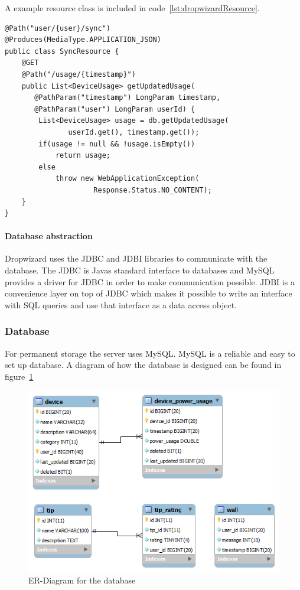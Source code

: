 A example resource class is included in code~\ref{lst:dropwizardResource}.
\newpage

\begin{lstlisting}[caption={Dropwizard resource example}, label={lst:dropwizardResource}]
@Path("user/{user}/sync")
@Produces(MediaType.APPLICATION_JSON)
public class SyncResource {
    @GET
    @Path("/usage/{timestamp}")
    public List<DeviceUsage> getUpdatedUsage(
	   @PathParam("timestamp") LongParam timestamp, 
	   @PathParam("user") LongParam userId) {
        List<DeviceUsage> usage = db.getUpdatedUsage(
		       userId.get(), timestamp.get());
        if(usage != null && !usage.isEmpty())
            return usage;
        else
            throw new WebApplicationException(
			         Response.Status.NO_CONTENT);
    }
}
\end{lstlisting}

\paragraph{Database abstraction}
Dropwizard uses the JDBC and JDBI libraries to communicate with the database. The JDBC is Javas standard interface to databases and MySQL provides a driver for JDBC in order to make communication possible. JDBI is a convenience layer on top of JDBC which makes it possible to write an interface with SQL queries and use that interface as a data access object.

\subsubsection{Database}
For permanent storage the server uses MySQL. MySQL is a reliable and easy to set up database. A diagram of how the database is designed can be found in figure~\ref{fig:ER-Diagram}

\begin{figure}[H]
\includegraphics[width=\textwidth]{ch/architecture/fig/ER-Diagram.png}
\caption{ER-Diagram for the database}
\label{fig:ER-Diagram}
\end{figure}
